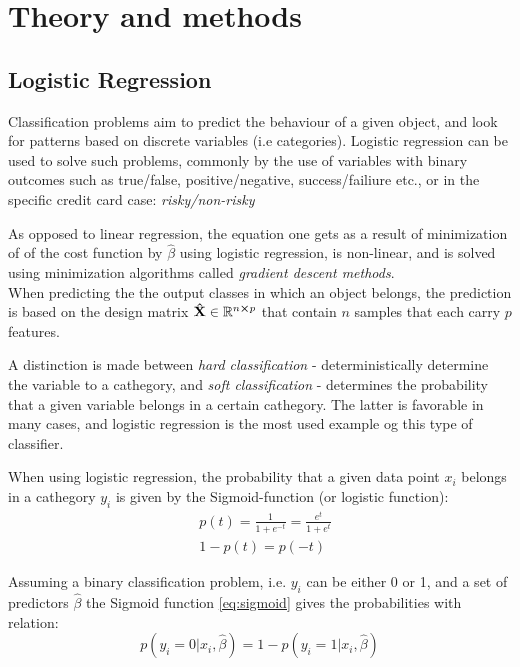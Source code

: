 \section{Theory and methods}
\label{sec:theory}

\subsection{Logistic Regression}
Classification problems aim to predict the behaviour of a given object, and look for patterns based on discrete variables (i.e categories). Logistic regression can be used to solve such problems, commonly by the use of variables with binary outcomes such as true/false, positive/negative, success/failiure etc., or in the specific credit card case: \textit{risky/non-risky}

As opposed to linear regression, the equation one gets as a result of minimization of of the cost function by $\hat{\beta}$ using logistic regression, is non-linear, and is solved using minimization algorithms called \emph{gradient descent methods}. \\

When predicting the the output classes in which an object belongs, the prediction is based on the design matrix $\mathbf{\hat{X}} \in \mathbb{R}^{n\cross p}$ that contain $n$ samples that each carry $p$ features.

A distinction is made between \textit{hard classification} - deterministically determine the variable to a cathegory, and \textit{soft classification} - determines the probability that a given variable belongs in a certain cathegory. The latter is favorable in many cases, and logistic regression is the most used example og this type of classifier.

When using logistic regression, the probability that a given data point $x_i$ belongs in a cathegory $y_i$ is given by the Sigmoid-function (or logistic function):
\begin{equation}
\begin{split}
    & p(t) = \frac{1}{1 + e^{-t}} = \frac{e^t}{1+e^t} \\
    & 1-p(t) = p(-t)
\end{split}
  \label{eq:sigmoid}
\end{equation}

Assuming a binary classification problem, i.e. $y_i$ can be either 0 or 1, and a set of predictors $\hat{\beta}$ the Sigmoid function \eqref{eq:sigmoid} gives the probabilities with relation:
\begin{equation*}
  p(y_i = 0|x_i,\hat{\beta})  = 1 - p(y_i = 1|x_i,\hat{\beta})
  \label{eq:prob_relation}
\end{equation*}

